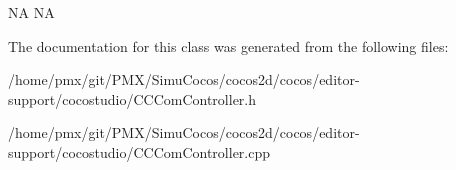 NA  NA 

The documentation for this class was generated from the following files\+:\begin{DoxyCompactItemize}
\item 
/home/pmx/git/\+P\+M\+X/\+Simu\+Cocos/cocos2d/cocos/editor-\/support/cocostudio/C\+C\+Com\+Controller.\+h\item 
/home/pmx/git/\+P\+M\+X/\+Simu\+Cocos/cocos2d/cocos/editor-\/support/cocostudio/C\+C\+Com\+Controller.\+cpp\end{DoxyCompactItemize}
